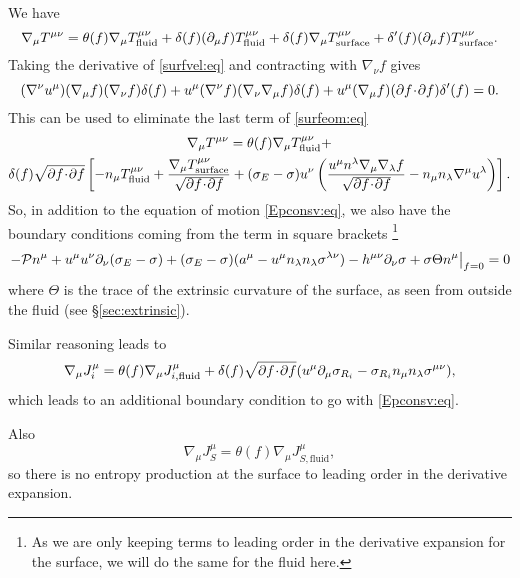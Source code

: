 \documentclass[12pt]{article}
\newcommand{\ploc}{\mathcal{P}}
\begin{document}
We have
%
\begin{equation}\label{surfeom:eq}
  \nabla_\mu T^{\mu\nu} = \theta(f)\nabla_\mu T^{\mu\nu}_\text{fluid} + \delta(f)(\partial_\mu f) T^{\mu\nu}_\text{fluid} + \delta(f)\nabla_\mu T^{\mu\nu}_\text{surface} + \delta'(f)(\partial_\mu f) T^{\mu\nu}_\text{surface}.
\end{equation}
%
Taking the derivative of \eqref{surfvel:eq} and contracting with $\nabla_\nu f$ gives
%
\begin{equation*}
  (\nabla^\nu u^\mu) (\nabla_\mu f) (\nabla_\nu f) \delta(f)
  + u^\mu (\nabla^\nu f) (\nabla_\nu \nabla_\mu f) \delta(f)
  + u^\mu (\nabla_\mu f) (\partial f \!\cdot\! \partial f) \delta'(f)
  = 0.
\end{equation*}
%
This can be used to eliminate the last term of \eqref{surfeom:eq}
%
\begin{multline}\label{surfeom2:eq}
  \nabla_\mu T^{\mu\nu} = \theta(f)\nabla_\mu T^{\mu\nu}_\text{fluid} +\\ \delta(f)\sqrt{\partial f \!\cdot\! \partial f}\left [ 
  -n_\mu T^{\mu\nu}_\text{fluid} + \frac{\nabla_\mu T^{\mu\nu}_\text{surface}}{\sqrt{\partial f \!\cdot\! \partial f}}
  +(\sigma_E-\sigma)u^\nu\left ( \frac{u^\mu n^\lambda \nabla_\mu\nabla_\lambda f}{\sqrt{\partial f \!\cdot\! \partial f}} - n_\mu n_\lambda \nabla^\mu u^\lambda \right )
   \right ].
\end{multline}
%
So, in addition to the equation of motion \eqref{Epconsv:eq}, we also have the boundary conditions coming from the term in square brackets
\footnote{As we are only keeping terms to leading order in the derivative expansion for the surface, we will do the same for the fluid here.}
%
\begin{equation}\label{surfbc:eq}
  \left.
  -\ploc n^\mu + u^\mu u^\nu \p_\nu (\sigma_E-\sigma) 
  +(\sigma_E-\sigma)(  a^\mu - u^\mu n_\lambda n_\lambda \sigma^{\lambda\nu})
  -h^{\mu\nu}\p_\nu\sigma + \sigma\Theta n^\mu
  \right\vert_{f=0} = 0
\end{equation}
%
where $\Theta$ is the trace of the extrinsic curvature of the surface, as seen from outside the fluid (see \S\ref{sec:extrinsic}).

Similar reasoning leads to
%
\begin{equation}\label{surfchbc:eq}
  \nabla_\mu J^\mu_i= \theta(f)\nabla_\mu J^\mu_{i,\text{fluid}} 
   + \delta(f)\sqrt{\partial f \!\cdot\! \partial f} (u^\mu\partial_\mu\sigma_{R_i} - \sigma_{R_i}n_\mu n_\lambda \sigma^{\mu\nu}),
\end{equation}
%
which leads to an additional boundary condition to go with \eqref{Epconsv:eq}.

Also
%
\begin{equation*}
  \nabla_\mu J^\mu_S= \theta(f)\nabla_\mu J^\mu_{S,\text{fluid}},
\end{equation*}
%
so there is no entropy production at the surface to leading order in the derivative expansion.
\end{document}

